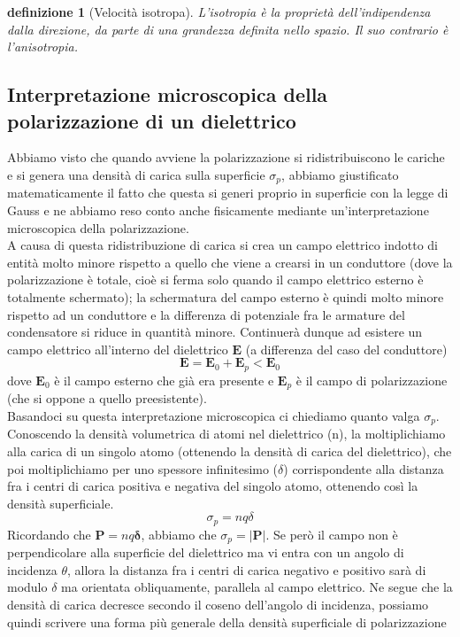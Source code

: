 \documentclass[10pt,a4paper]{article}
\newtheorem{definizione}{definizione}
\begin{document}
\begin{definizione}[Velocità isotropa]
	L'isotropia è la proprietà dell'indipendenza dalla direzione, da parte di una grandezza definita nello spazio. Il suo contrario è l'anisotropia.
\end{definizione}
\subsection{Interpretazione microscopica della polarizzazione di un dielettrico}
Abbiamo visto che quando avviene la polarizzazione si ridistribuiscono le cariche e si genera una densità di carica sulla superficie \(\sigma_p\), abbiamo giustificato matematicamente il fatto che questa si generi proprio in superficie con la legge di Gauss e ne abbiamo reso conto anche fisicamente mediante un'interpretazione microscopica della polarizzazione.\\
A causa di questa ridistribuzione di carica si crea un campo elettrico indotto di entità molto minore rispetto a quello che viene a crearsi in un conduttore (dove la polarizzazione è totale, cioè si ferma solo quando il campo elettrico esterno è totalmente schermato); la schermatura del campo esterno è quindi molto minore rispetto ad un conduttore e la differenza di potenziale fra le armature del condensatore si riduce in quantità minore. Continuerà dunque ad esistere un campo elettrico all'interno del dielettrico $\mathbf{E}$ (a differenza del caso del conduttore)
\[\mathbf{E} = \mathbf{E}_0+\mathbf{E}_p<\mathbf{E}_0\]
dove $\mathbf{E}_0$ è il campo esterno che già era presente e $\mathbf{E}_p$ è il campo di polarizzazione (che si oppone a quello preesistente).\\
Basandoci su questa interpretazione microscopica ci chiediamo quanto valga $\sigma_p$. Conoscendo la densità volumetrica di atomi nel dielettrico (n), la moltiplichiamo alla carica di un singolo atomo (ottenendo la densità di carica del dielettrico), che poi moltiplichiamo per uno spessore infinitesimo (\(\delta\)) corrispondente alla distanza fra i centri di carica positiva e negativa del singolo atomo, ottenendo così la densità superficiale.
\[\sigma_p = n q \delta\]
Ricordando che \(\mathbf{P} = nq\mathbf{\delta}\), abbiamo che $\sigma_p = |\mathbf{P}|$. Se però il campo non è perpendicolare alla superficie del dielettrico ma vi entra con un angolo di incidenza $\theta$, allora la distanza fra i centri di carica negativo e positivo sarà di modulo $\delta$ ma orientata obliquamente, parallela al campo elettrico. Ne segue che la densità di carica decresce secondo il coseno dell'angolo di incidenza, possiamo quindi scrivere una forma più generale della densità superficiale di polarizzazione
\end{document}
